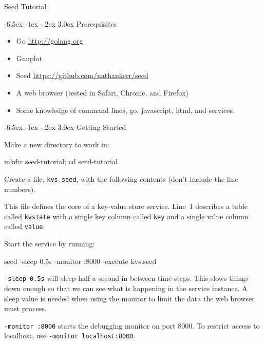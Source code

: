 \documentclass[a5paper,12pt,onecolumn]{article}
\makeatletter
\def\code#1{\mbox{\lstinline{#1}}}
\renewcommand\section{\@startsection {section}{1}{\z@}%
	{-6.5ex \@plus -1ex \@minus -.2ex}%
	{3.0ex}%
	{\sf\Large}}
\makeatother
\begin{document}
\begin{center}
	\sf\Huge Seed Tutorial
\end{center}

\section{Prerequisites}

\begin{itemize}
\item Go \url{http://golang.org}
\item Gnuplot
\item Seed \url{https://github.com/nathankerr/seed}
\item A web browser (tested in Safari, Chrome, and Firefox)
\item Some knowledge of command lines, go, javascript, html, and services.
\end{itemize}

\section{Getting Started}

Make a new directory to work in:

\begin{cli}
mkdir seed-tutorial; cd seed-tutorial
\end{cli}

Create a file, \code{kvs.seed}, with the following contents (don't include the line numbers).



This file defines the core of a key-value store service. Line~1 describes a table called \code{kvstate} with a single key column called \code{key} and a single value column called \code{value}.

Start the service by running:

\begin{cli}
seed -sleep 0.5s -monitor :8000 -execute kvs.seed
\end{cli}

\code{-sleep 0.5s} will sleep half a second in between time steps. This slows things down enough so that we can see what is happening in the service instance. A sleep value is needed when using the monitor to limit the data the web browser must process.

\code{-monitor :8000} starts the debugging monitor on port 8000. To restrict access to localhost, use \code{-monitor localhost:8000}.
\end{document}
